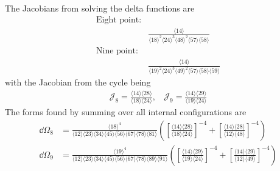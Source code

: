 \documentclass[letter,11pt]{article}
\newcommand{\J}{\mathcal{J}}
\newcommand{\ab}[1]{\langle #1 \rangle}
\begin{document}
The Jacobians from solving the delta functions are
\begin{equation}
	\begin{aligned}
		\text{Eight point}:&\\
		&\frac{\ab{14}}{\ab{18}^2\ab{24}^3\ab{48}^2\ab{57}\ab{58}}\\
		\text{Nine point}:&\\
		&\frac{\ab{14}}{\ab{19}^2\ab{24}^3\ab{49}^2\ab{57}\ab{58}\ab{59}}
	\end{aligned}
\end{equation}
with the Jacobian from the cycle being
\begin{equation}
	\begin{aligned}
		\J_8=\frac{\ab{14}\ab{28}}{\ab{18}\ab{24}},~~~~
		\J_9=\frac{\ab{14}\ab{29}}{\ab{19}\ab{24}}
	\end{aligned}
\end{equation}
The forms found by summing over all internal configurations are
\begin{equation}
	\begin{aligned}
		\dd \Omega_8 &= \frac{\ab{18}^4}{\ab{12}\ab{23}\ab{34}\ab{45}\ab{56}\ab{67}\ab{78}\ab{81}}\left(\left[\frac{\ab{14}\ab{28}}{\ab{18}\ab{24}}
		\right]^{-4}+\left[\frac{\ab{14}\ab{28}}{\ab{12}\ab{48}}
		\right]^{-4}\right) \\
		\dd \Omega_9 &= \frac{\ab{19}^4}{\ab{12}\ab{23}\ab{34}\ab{45}\ab{56}\ab{67}\ab{78}\ab{89}\ab{91}}\left(\left[\frac{\ab{14}\ab{29}}{\ab{19}\ab{24}}
		\right]^{-4}+\left[\frac{\ab{14}\ab{29}}{\ab{12}\ab{49}}
		\right]^{-4}\right)
	\end{aligned}
\end{equation}
\end{document}
